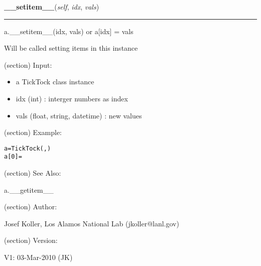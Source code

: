     \vspace{0.5ex}

\hspace{.8\funcindent}\begin{boxedminipage}{\funcwidth}

    \raggedright \textbf{\_\_setitem\_\_}(\textit{self}, \textit{idx}, \textit{vals})

    \vspace{-1.5ex}

    \rule{\textwidth}{0.5\fboxrule}
\setlength{\parskip}{2ex}
    a.\_\_setitem\_\_(idx, vals) or a[idx] = vals

    Will be called setting items in this instance

    (section) Input:

      \begin{itemize}
      \setlength{\parskip}{0.6ex}
        \item a TickTock class instance

        \item idx (int) : interger numbers as index

        \item vals (float, string, datetime) : new values

      \end{itemize}

    (section) Example:

\begin{alltt}
\pysrcprompt{{\textgreater}{\textgreater}{\textgreater} }a = TickTock(, )
\pysrcprompt{{\textgreater}{\textgreater}{\textgreater} }a[0] = \end{alltt}
    (section) See Also:

      a.\_\_getitem\_\_

    (section) Author:

      Josef Koller, Los Alamos National Lab (jkoller@lanl.gov)

    (section) Version:

      V1: 03-Mar-2010 (JK)

\setlength{\parskip}{1ex}
    \end{boxedminipage}

    \label{spacepy:spacetime:TickTock:__len__}

